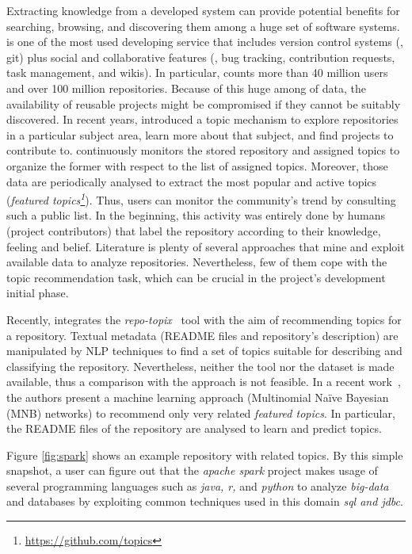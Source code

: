 Extracting knowledge from a developed system can provide potential benefits for searching, browsing, and discovering them among a huge set of software systems.
\GH is one of the most used developing service that includes version control systems (\ie, git) plus social and collaborative features (\eg,  bug tracking, contribution requests, task management, and wikis).
In particular, \GH counts more than 40 million users and over 100 million repositories. Because of this huge among of data, the availability of reusable projects might be compromised if they cannot be suitably discovered. In recent years, \GH introduced a topic mechanism to explore repositories in a particular subject area, learn more about that subject, and find projects to contribute to.
\GH continuously monitors the stored repository and assigned topics to organize the former with respect to the list of assigned topics. Moreover, those data are periodically analysed to extract the most popular and active topics (\ie \emph{featured topics\footnote{\url{https://github.com/topics}}}). Thus, users can monitor the community’s trend by consulting such a public list. In the beginning, this activity was entirely done by humans (\ie project contributors) that label the repository according to their knowledge, feeling and belief. Literature is plenty of several approaches that mine and exploit available data to analyze repositories. Nevertheless, few of them cope with the topic recommendation task, which can be crucial in the project's development initial phase.

Recently, \GH integrates the \emph{repo-topix}~\cite{repo-topix} tool with the aim of recommending topics for a \GH repository. Textual metadata (\ie README files and repository's description) are manipulated by NLP techniques to find a set of topics suitable for describing and classifying the repository. Nevertheless, neither the tool nor the dataset is made available, thus a comparison with the approach is not feasible.
In a recent work~\cite{10.1145/3383219.3383227}, the authors present a machine learning approach (\ie Multinomial Na\"{i}ve Bayesian (MNB) networks) to recommend only very related \emph{featured topics}. In particular, the README files of the repository are analysed to learn and predict \GH topics.


Figure \ref{fig:spark} shows an example repository with related topics. By this simple snapshot, a \GH user can figure out that the \emph{apache spark} project makes usage of several programming languages such as \emph{java, r,} and \emph{python} to analyze \emph{big-data} and databases by exploiting common techniques used in this domain \ie \emph{sql and jdbc}. 

